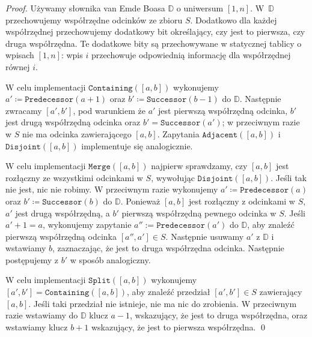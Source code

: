\documentclass[runningheads]{llncs}
\begin{document}
\begin{proof}
Używamy słownika van Emde Boasa $\mathbb{D}$ o uniwersum $[1,n]$. W~$\mathbb{D}$
przechowujemy współrzędne odcinków ze zbioru $S$. Dodatkowo dla każdej współrzędnej przechowujemy dodatkowy bit określający, czy jest to pierwsza, czy
druga współrzędna. Te dodatkowe bity są przechowywane w statycznej tablicy o wpisach $[1,n]$: wpis $i$ przechowuje odpowiednią informację dla współrzędnej równej $i$.

W celu implementacji $\mathtt{Containing}([a,b])$ wykonujemy
$a'\coloneqq \mathtt{Predecessor}(a+1)$ oraz
$b'\coloneqq \mathtt{Successor}(b-1)$ do $\mathbb{D}$. Następnie
zwracamy $[a',b']$, pod warunkiem że $a'$ jest pierwszą współrzędną odcinka, $b'$ jest drugą współrzędną odcinka oraz $b'=\mathtt{Successor}(a')$; w przeciwnym razie w $S$ nie ma odcinka zawierającego $[a,b]$. Zapytania $\mathtt{Adjacent}([a,b])$ i $\mathtt{Disjoint}([a,b])$ implementuje się
analogicznie.

W celu implementacji $\mathtt{Merge}([a,b])$ najpierw sprawdzamy, czy $[a,b]$ jest rozłączny ze wszystkimi odcinkami w $S$, wywołując $\mathtt{Disjoint}([a,b])$. 
Jeśli tak nie jest, nic nie robimy.
W przeciwnym razie wykonujemy
$a'\coloneqq\mathtt{Predecessor}(a)$ oraz
$b'\coloneqq\mathtt{Successor}(b)$ do $\mathbb{D}$.
Ponieważ $[a,b]$ jest rozłączny z odcinkami w $S$, $a'$ jest drugą
współrzędną, a $b'$ pierwszą współrzędną pewnego odcinka w $S$. Jeśli $a'+1=a$,
wykonujemy zapytanie $a'':=\mathtt{Predecessor}(a')$ do
$\mathbb{D}$, aby znaleźć pierwszą współrzędną odcinka
$[a'',a'] \in S$. Następnie usuwamy $a'$ z $\mathbb{D}$ i
wstawiamy $b$, zaznaczając, że jest to druga współrzędna odcinka. 
Następnie
postępujemy z $b'$ w sposób analogiczny.

W celu implementacji $\mathtt{Split}([a,b])$ wykonujemy
$[a',b']=\mathtt{Containing}([a,b])$, aby znaleźć
przedział
$[a',b']\in S$ zawierający $[a,b]$. Jeśli taki przedział nie istnieje, nie ma nic do zrobienia.
W przeciwnym razie wstawiamy do
$\mathbb{D}$ klucz $a-1$, wskazujący, że jest to druga współrzędna,
oraz wstawiamy klucz $b+1$ wskazujący, że jest to pierwsza współrzędna.
\qed



\end{proof}
\end{document}
